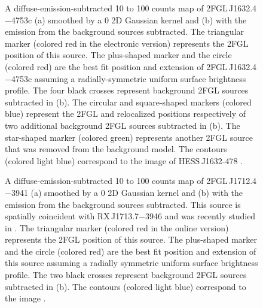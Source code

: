 \documentclass[12pt,preprint]{aastex}
\newif\ifcolorfigure
\newcommand{\gev}{\text{GeV}\xspace}
\newcommand{\tev}{\text{TeV}\xspace}
\begin{document}
\begin{figure}
    \ifcolorfigure
      \plotone{source_plots/source_HESS_J1632-478_color.eps}
    \else
    \fi
  \caption{
  A diffuse-emission-subtracted 10 \gev to 100 \gev counts map of
  2FGL\,J1632.4$-$4753c (a) smoothed by a 0 2D Gaussian
  kernel and (b) with the emission from the background sources subtracted.  
  The triangular marker (colored red in the electronic version)
  represents the 2FGL position of this source.  The plus-shaped marker
  and the circle (colored red) are the best fit position and extension of
  2FGL\,J1632.4$-$4753c assuming a radially-symmetric uniform surface
  brightness profile.  
  The four black crosses represent background 2FGL
  sources subtracted in (b).  The 
  circular and square-shaped markers (colored blue) represent 
  the 2FGL and relocalized positions respectively of two
  additional background 2FGL sources subtracted in (b).
  The star-shaped marker (colored green) represents another 2FGL
  source that was removed from the background model.  
  The contours (colored light blue) correspond to the \tev image of
  HESS\,J1632-478 \citep{hess_plane_survey}.
  }\label{1FGL_J1632.9-4802c}
\end{figure}

\begin{figure}
    \ifcolorfigure
      \plotone{source_plots/source_RX_J1713.7-3946_color.eps}
    \else
    \fi
  \caption{
  A diffuse-emission-subtracted 10 \gev to 100 \gev counts map
  of 2FGL\,J1712.4$-$3941 (a) smoothed by a 0 2D
  Gaussian kernel and (b) with the emission from the background sources
  subtracted.  This source is spatially coincident with RX\,J1713.7$-$3946
  and was recently studied in \cite{rx_j1713_lat}.  The triangular marker
  (colored red in the online version) represents the 2FGL position of
  this source.  The plus-shaped marker and the circle (colored red) are
  the best fit position and extension of this source assuming a radially
  symmetric uniform surface brightness profile.  
  The two black crosses represent background 2FGL sources subtracted in (b).
  The contours (colored light blue)
  correspond to the \tev image \citep{rx_j1713_hess}.  
  }\label{2FGL_J1712.4-3941}
\end{figure}
\end{document}
